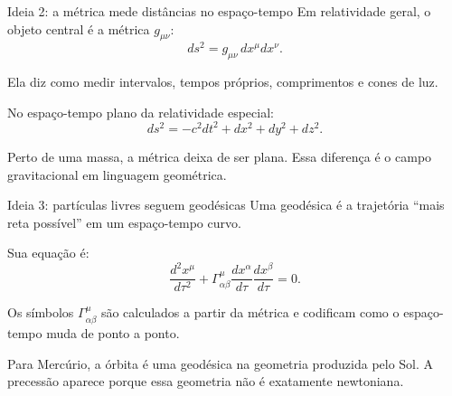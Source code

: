 \documentclass[aspectratio=169,10pt]{beamer}
\begin{document}
\begin{frame}{Ideia 2: a métrica mede distâncias no espaço-tempo}
  Em relatividade geral, o objeto central é a métrica $g_{\mu\nu}$:
  \[
    ds^2 = g_{\mu\nu}\,dx^\mu dx^\nu.
  \]

  \vspace{0.25cm}
  Ela diz como medir intervalos, tempos próprios, comprimentos e cones de luz.

  \vspace{0.35cm}
  No espaço-tempo plano da relatividade especial:
  \[
    ds^2 = -c^2dt^2 + dx^2 + dy^2 + dz^2.
  \]

  \vspace{0.25cm}
  Perto de uma massa, a métrica deixa de ser plana. Essa diferença é o campo gravitacional em linguagem geométrica.
\end{frame}

\begin{frame}{Ideia 3: partículas livres seguem geodésicas}
  Uma geodésica é a trajetória ``mais reta possível'' em um espaço-tempo curvo.

  \vspace{0.25cm}
  Sua equação é:
  \[
    \frac{d^2x^\mu}{d\tau^2}
    +
    \Gamma^\mu_{\alpha\beta}
    \frac{dx^\alpha}{d\tau}
    \frac{dx^\beta}{d\tau}
    = 0.
  \]

  \vspace{0.25cm}
  Os símbolos $\Gamma^\mu_{\alpha\beta}$ são calculados a partir da métrica e codificam como o espaço-tempo muda de ponto a ponto.

  \vspace{0.35cm}
  Para Mercúrio, a órbita é uma geodésica na geometria produzida pelo Sol. A precessão aparece porque essa geometria não é exatamente newtoniana.
\end{frame}
\end{document}
